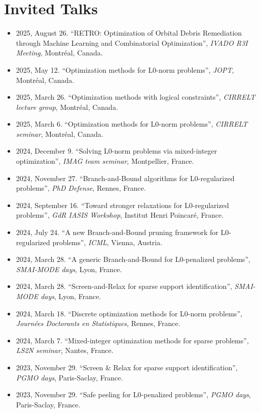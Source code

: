 \section{Invited Talks}

\begin{itemize}
    \item 2025, August 26. ``RETRO: Optimization of Orbital Debris Remediation through Machine Learning and Combinatorial Optimization'', \textit{IVADO R3I Meeting}, Montréal, Canada.
    \item 2025, May 12. ``Optimization methods for L0-norm problems'', \textit{JOPT}, Montréal, Canada.
    \item 2025, March 26. ``Optimization methods with logical constraints'', \textit{CIRRELT lecture group}, Montréal, Canada.
    \item 2025, March 6. ``Optimization methods for L0-norm problems'', \textit{CIRRELT seminar}, Montréal, Canada.
    \item 2024, December 9. ``Solving L0-norm problems via mixed-integer optimization'', \textit{IMAG team seminar}, Montpellier, France.
    \item 2024, November 27. ``Branch-and-Bound algorithms for L0-regularized problems'', \textit{PhD Defense}, Rennes, France.
    \item 2024, September 16. ``Toward stronger relaxations for L0-regularized problems'', \textit{GdR IASIS Workshop}, Institut Henri Poincaré, France.
    \item 2024, July 24. ``A new Branch-and-Bound pruning framework for L0-regularized problems'', \textit{ICML}, Vienna, Austria.
    \item 2024, March 28. ``A generic Branch-and-Bound for L0-penalized problems'', \textit{SMAI-MODE days}, Lyon, France.
    \item 2024, March 28. ``Screen-and-Relax for sparse support identification'', \textit{SMAI-MODE days}, Lyon, France.
    \item 2024, March 18. ``Discrete optimization methods for L0-norm problems'', \textit{Journées Doctorants en Statistiques}, Rennes, France.
    \item 2024, March 7. ``Mixed-integer optimization methods for sparse problems'', \textit{LS2N seminar}, Nantes, France.
    \item 2023, November 29. ``Screen \& Relax for sparse support identification'', \textit{PGMO days}, Paris-Saclay, France.
    \item 2023, November 29. ``Safe peeling for L0-penalized problems'', \textit{PGMO days}, Paris-Saclay, France.

\end{itemize}
